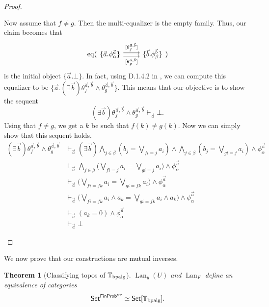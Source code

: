\documentclass[a4paper]{amsproc}
\theoremstyle{plain}
\newtheorem{theorem}{Theorem}[section]
\theoremstyle{definition}
\theoremstyle{remark}
\numberwithin{equation}{section}
\newcommand{\y}{\textit{y}}
\DeclareMathOperator{\Lan}{Lan}
\DeclareMathOperator{\eq}{eq}
\newcommand{\Set}{\textup{\textsf{Set}}}
\newcommand{\FinProb}{\textup{\textsf{FinProb}}}
\begin{document}
\begin{proof}
\begin{enumerate}
        Now assume that $f \neq g$. Then the multi-equalizer is the empty family. Thus, our claim becomes that
        \[
            \eq(\begin{tikzcd}
                \{ \vec{a}.\phi^{\vec{a}}_{\alpha} \} \arrow[r, "{[\theta^{\vec{a},\vec{b}}_f]}", shift left] \arrow[r, "{[\theta^{\vec{a},\vec{b}}_g]}"', shift right] & \{ \vec{b}.\phi^{\vec{b}}_{\beta} \}
                \end{tikzcd})
        \]
        is the initial object $\{\vec{a}.\bot\}$. In fact, using D.1.4.2 in \cite{johnstone2002sketches2}, we can compute this equalizer to be $\{ \vec{a} . (\exists \vec{b}) \theta_f^{\vec{a},\vec{b}} \wedge \theta_g^{\vec{a},\vec{b}} \}$. This means that our objective is to show the sequent
        \[
            (\exists \vec{b}) \theta_f^{\vec{a},\vec{b}} \wedge \theta_g^{\vec{a},\vec{b}} \vdash_{\vec{a}} \bot .
        \]
        Using that $f \neq g$, we get a $k$ be such that $f(k) \neq g(k)$. Now we can simply show that this sequent holds.
        \begin{align*}
            (\exists \vec{b}) \theta_f^{\vec{a},\vec{b}} \wedge \theta_g^{\vec{a},\vec{b}}
            &\vdash_{\vec{a}} (\exists \vec{b}) \bigwedge_{j \in \beta} (b_j = \bigvee_{f i = j} a_i) \wedge \bigwedge_{j \in \beta} (b_j = \bigvee_{g i = j} a_i) \wedge \phi_{\alpha}^{\vec{a}} \\
            &\vdash_{\vec{a}} \bigwedge_{j \in \beta} \big ( \bigvee_{f i = j} a_i = \bigvee_{g i = j} a_i \big ) \wedge \phi_{\alpha}^{\vec{a}} \\
            &\vdash_{\vec{a}} \big ( \bigvee_{f i = f k} a_i = \bigvee_{g i = f k} a_i \big ) \wedge \phi_{\alpha}^{\vec{a}} \\
            &\vdash_{\vec{a}} \big ( \bigvee_{f i = f k} a_i \wedge a_k = \bigvee_{g i = f k} a_i \wedge a_k \big ) \wedge \phi_{\alpha}^{\vec{a}}\\
            &\vdash_{\vec{a}} (a_k = 0) \wedge \phi_{\alpha}^{\vec{a}} \\
            &\vdash_{\vec{a}} \bot
        \end{align*}
    \end{enumerate}
\end{proof}

We now prove that our constructions are mutual inverses.

\begin{theorem}[Classifying topos of $\mathbb{T}_{\textup{bpalg}}$] \label{classifying_presheaf}
$\Lan_{\y}(U)$ and $\Lan_F$ define an equivalence of categories
\[
\Set^{\FinProb^{op}} \simeq \Set[\mathbb{T}_{\textup{bpalg}}].
\]
\end{theorem}
\end{document}
